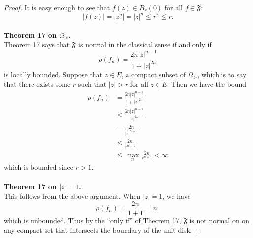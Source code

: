 \documentclass{article}
\begin{document}
\begin{proof}
  It is easy enough to see that $f(z) \in \overline{B_r}(0)$ for all
  $f \in \mathfrak{F}$: \[
    |f(z)| = |z^n| = |z|^n \leq r^n \leq r.
  \]\\
  \textbf{Theorem 17 on $\Omega_>$.}\\
  Theorem 17 says that $\mathfrak{F}$ is normal in the classical sense if and
  only if \[
    \rho(f_n) = \frac{2n|z|^{n-1}}{1 + |z|^{2n}}
  \] is locally bounded.
  Suppose that $z \in E$, a compact subset of $\Omega_>$, which is to say that
  there exists some $r$ such that $|z| > r$ for all $z \in E$. Then we have
  the bound \begin{align*}
    \rho(f_n) &= \frac{2n|z|^{n-1}}{1 + |z|^{2n}} \\
    &< \frac{2n|z|^{n-1}}{|z|^{2n}} \\
    &= \frac{2n}{|z|^{n+1}} \\
    &\leq \frac{2n}{r^{n+1}} \\
    &\leq \max_n\frac{2n}{r^{n+1}} < \infty
  \end{align*} which is bounded since $r > 1$.
  \\~\\
  \textbf{Theorem 17 on $|z| = 1$.}\\
  This follows from the above argument. When $|z| = 1$, we have \[
    \rho(f_n) = \frac{2n}{1 + 1} = n,
  \] which is unbounded. Thus by the ``only if'' of Theorem 17, $\mathfrak{F}$
  is not normal on on any compact set that intersects the boundary of the unit
  disk.
\end{proof}
\pagebreak
\end{document}
